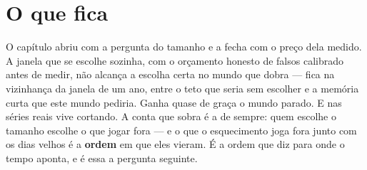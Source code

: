 \section{O que fica}

O capítulo abriu com a pergunta do tamanho e a fecha com o preço dela medido. A janela que se
escolhe sozinha, com o orçamento honesto de falsos calibrado antes de medir, não alcança a escolha
certa no mundo que dobra --- fica na vizinhança da janela de um ano, entre o teto que seria sem
escolher e a memória curta que este mundo pediria. Ganha quase de graça o mundo parado. E nas
séries reais vive cortando. A conta que sobra é a de sempre: quem escolhe o tamanho escolhe o que
jogar fora --- e o que o esquecimento joga fora junto com os dias velhos é a \textbf{ordem} em que
eles vieram. É a ordem que diz para onde o tempo aponta, e é essa a pergunta seguinte.